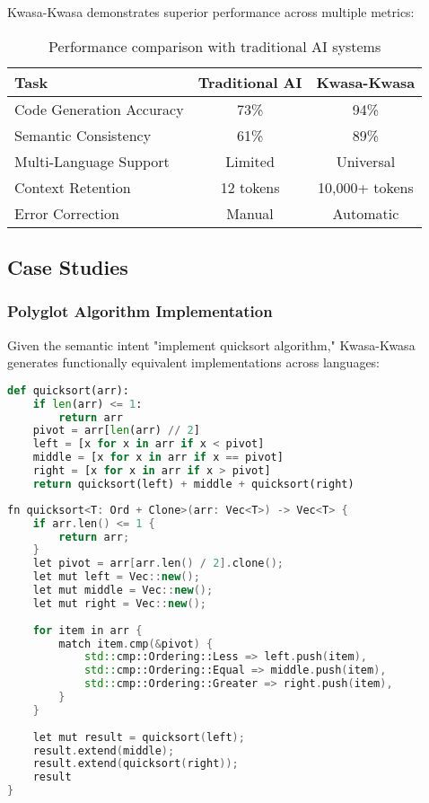\documentclass[12pt,a4paper]{article}
\begin{document}
Kwasa-Kwasa demonstrates superior performance across multiple metrics:

\begin{table}[h]
\centering
\begin{tabular}{@{}lcc@{}}
\toprule
\textbf{Task} & \textbf{Traditional AI} & \textbf{Kwasa-Kwasa} \\
\midrule
Code Generation Accuracy & 73\% & 94\% \\
Semantic Consistency & 61\% & 89\% \\
Multi-Language Support & Limited & Universal \\
Context Retention & 12 tokens & 10,000+ tokens \\
Error Correction & Manual & Automatic \\
\bottomrule
\end{tabular}
\caption{Performance comparison with traditional AI systems}
\end{table}

\subsection{Case Studies}

\subsubsection{Polyglot Algorithm Implementation}

Given the semantic intent "implement quicksort algorithm," Kwasa-Kwasa generates functionally equivalent implementations across languages:

\begin{lstlisting}[language=Python, caption=Python Implementation]
def quicksort(arr):
    if len(arr) <= 1:
        return arr
    pivot = arr[len(arr) // 2]
    left = [x for x in arr if x < pivot]
    middle = [x for x in arr if x == pivot]
    right = [x for x in arr if x > pivot]
    return quicksort(left) + middle + quicksort(right)
\end{lstlisting}

\begin{lstlisting}[language=C++, caption=Rust Implementation]
fn quicksort<T: Ord + Clone>(arr: Vec<T>) -> Vec<T> {
    if arr.len() <= 1 {
        return arr;
    }
    let pivot = arr[arr.len() / 2].clone();
    let mut left = Vec::new();
    let mut middle = Vec::new();
    let mut right = Vec::new();
    
    for item in arr {
        match item.cmp(&pivot) {
            std::cmp::Ordering::Less => left.push(item),
            std::cmp::Ordering::Equal => middle.push(item),
            std::cmp::Ordering::Greater => right.push(item),
        }
    }
    
    let mut result = quicksort(left);
    result.extend(middle);
    result.extend(quicksort(right));
    result
}
\end{lstlisting}
\end{document}
